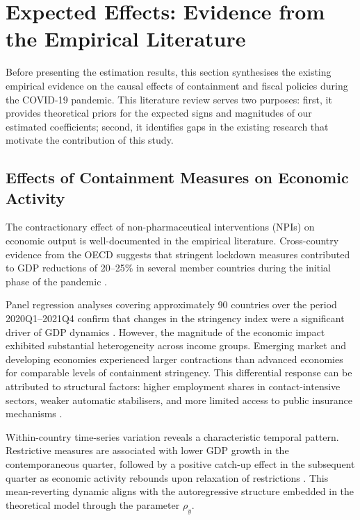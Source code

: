 \documentclass[12pt, a4paper]{article}
\begin{document}
\section{Expected Effects: Evidence from the Empirical Literature}
\label{sec:expected_effects}

Before presenting the estimation results, this section synthesises the existing empirical evidence on the causal effects of containment and fiscal policies during the COVID-19 pandemic. This literature review serves two purposes: first, it provides theoretical priors for the expected signs and magnitudes of our estimated coefficients; second, it identifies gaps in the existing research that motivate the contribution of this study.

\subsection{Effects of Containment Measures on Economic Activity}
\label{subsec:stringency_output}

The contractionary effect of non-pharmaceutical interventions (NPIs) on economic output is well-documented in the empirical literature. Cross-country evidence from the OECD suggests that stringent lockdown measures contributed to GDP reductions of 20--25\% in several member countries during the initial phase of the pandemic \citep{OECD2020}.

Panel regression analyses covering approximately 90 countries over the period 2020Q1--2021Q4 confirm that changes in the stringency index were a significant driver of GDP dynamics \citep{Lagakos2021}. However, the magnitude of the economic impact exhibited substantial heterogeneity across income groups. Emerging market and developing economies experienced larger contractions than advanced economies for comparable levels of containment stringency. This differential response can be attributed to structural factors: higher employment shares in contact-intensive sectors, weaker automatic stabilisers, and more limited access to public insurance mechanisms \citep{Lagakos2021, OECD2020}.

Within-country time-series variation reveals a characteristic temporal pattern. Restrictive measures are associated with lower GDP growth in the contemporaneous quarter, followed by a positive catch-up effect in the subsequent quarter as economic activity rebounds upon relaxation of restrictions \citep{Deb2021}. This mean-reverting dynamic aligns with the autoregressive structure embedded in the theoretical model through the parameter $\rho_y$.
\end{document}
